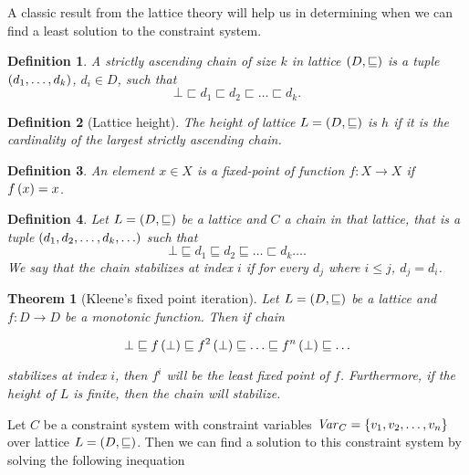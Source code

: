 \documentclass[..thesis.tex]{subfiles}
\newtheorem{defin}{Definition}[section]
\newtheorem{kleene-fix}{Theorem}[section]
\begin{document}
A classic result from the lattice theory will help us in determining when we can find a least solution to the constraint system.

\begin{defin}
  A \textit{strictly ascending chain} of size $k$ in lattice $\left( D, \sqsubseteq \right)$ is a tuple $\left( d_1, \ldots, d_k \right)$, $d_i \in D$, such that
  \begin{equation*}
    \bot \sqsubset d_1 \sqsubset d_2 \sqsubset \ldots \sqsubset d_k \text{.}
  \end{equation*}
\end{defin}

\begin{defin}[Lattice height]
  The \textit{height} of lattice $L=\left( D, \sqsubseteq \right)$ is $h$  if it is the cardinality of the largest strictly ascending chain.
\end{defin}

\begin{defin}
  An element $x \in X$ is a  \textit{fixed-point} of function  $f : X \to X$ if $ f \left( x \right) = x$.
\end{defin}

\begin{defin}
  Let $L = \left( D, \sqsubseteq \right)$ be a lattice and $C$ a \textit{chain} in that lattice, that is a tuple $ \left( d_1, d_2, \ldots, d_k, \ldots \right)$ such that
  \begin{equation*}
    \bot \sqsubseteq d_1 \sqsubseteq d_2 \sqsubseteq \ldots \sqsubset d_k \ldots \text{.}
  \end{equation*}
  We say that the chain \textit{stabilizes} at index $i$ if for every $d_j$ where $ i \leq j$, $ d_j = d_i$. 
\end{defin}

\begin{kleene-fix}[Kleene's fixed point iteration]
Let $L = \left( D, \sqsubseteq \right) $ be a lattice and $f : D \to D$ be a monotonic function. Then if chain 

\begin{equation*}
\bot \sqsubseteq f \left( \bot \right) \sqsubseteq f^2 \left( \bot \right) \sqsubseteq \ldots \sqsubseteq f^n \left( \bot \right) \sqsubseteq \ldots
\end{equation*}

stabilizes at index $i$, then $f^{i}$ will be the least fixed point of $f$. Furthermore, if the height of $L$ is finite, then the chain will stabilize.
\end{kleene-fix}

Let $C$ be a constraint system with constraint variables $\mathit{Var}_C= \left\lbrace v_1, v_2, \ldots, v_n \right\rbrace$ over lattice $L = \left( D, \sqsubseteq \right)$.
Then we can find a solution to this constraint system by solving the following inequation
\end{document}
